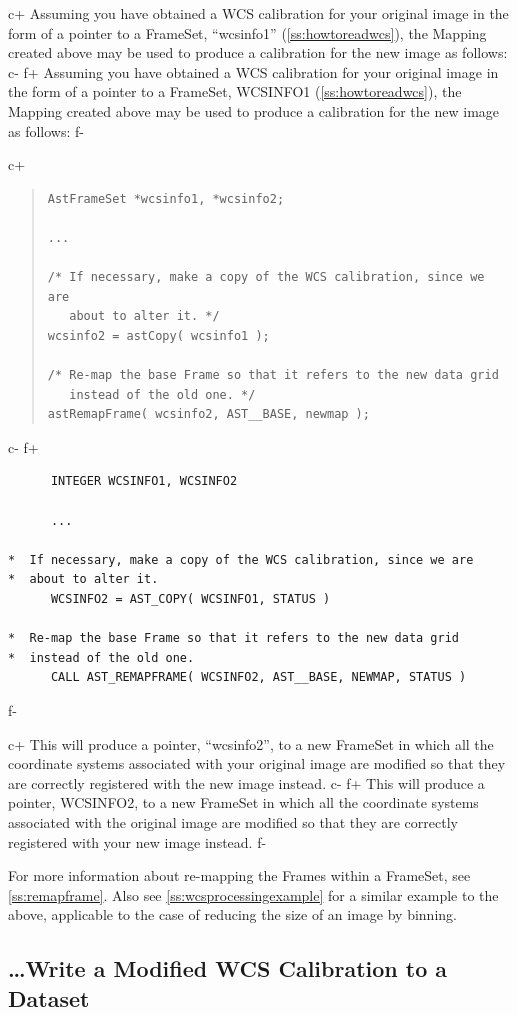 \documentclass[twoside,11pt]{article}
\newcommand{\secref}[1]{\S\ref{#1}}
\renewcommand{\secref}[1]{\ref{#1}}
\begin{document}
c+
Assuming you have obtained a WCS calibration for your original image
in the form of a pointer to a FrameSet, ``wcsinfo1''
(\secref{ss:howtoreadwcs}), the Mapping created above may be used to
produce a calibration for the new image as follows:
c-
f+
Assuming you have obtained a WCS calibration for your original image
in the form of a pointer to a FrameSet, WCSINFO1
(\secref{ss:howtoreadwcs}), the Mapping created above may be used to
produce a calibration for the new image as follows:
f-

c+
\begin{quote}
\small
\begin{verbatim}
AstFrameSet *wcsinfo1, *wcsinfo2;

...

/* If necessary, make a copy of the WCS calibration, since we are
   about to alter it. */
wcsinfo2 = astCopy( wcsinfo1 );

/* Re-map the base Frame so that it refers to the new data grid
   instead of the old one. */
astRemapFrame( wcsinfo2, AST__BASE, newmap );
\end{verbatim}
\normalsize
\end{quote}
c-
f+
\small
\begin{verbatim}
      INTEGER WCSINFO1, WCSINFO2

      ...

*  If necessary, make a copy of the WCS calibration, since we are
*  about to alter it.
      WCSINFO2 = AST_COPY( WCSINFO1, STATUS )

*  Re-map the base Frame so that it refers to the new data grid
*  instead of the old one.
      CALL AST_REMAPFRAME( WCSINFO2, AST__BASE, NEWMAP, STATUS )
\end{verbatim}
\normalsize
f-

c+
This will produce a pointer, ``wcsinfo2'', to a new FrameSet in which
all the coordinate systems associated with your original image are
modified so that they are correctly registered with the new image
instead.
c-
f+
This will produce a pointer, WCSINFO2, to a new FrameSet in which all
the coordinate systems associated with the original image are modified
so that they are correctly registered with your new image instead.
f-

For more information about re-mapping the Frames within a FrameSet,
see \secref{ss:remapframe}. Also see \secref{ss:wcsprocessingexample}
for a similar example to the above, applicable to the case of reducing
the size of an image by binning.

\subsection{\ldots Write a Modified WCS Calibration to a Dataset}
\end{document}
